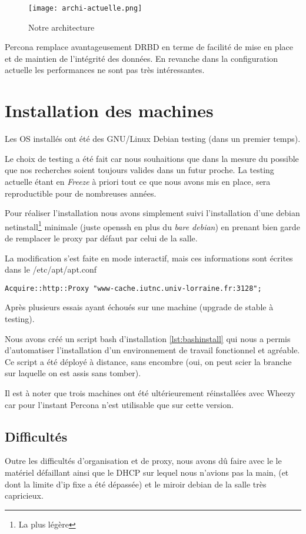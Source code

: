 \documentclass[a4paper,10pt,one side,titlepage]{report}
\begin{document}
\begin{figure}[H]
    \centering
    \texttt{[image: archi-actuelle.png]}
    \caption{Notre architecture}
    \label{fig:archiactuelle}
\end{figure}

Percona remplace avantageusement DRBD en terme de facilité de mise en place et de
maintien de l'intégrité des données. En revanche dans la configuration actuelle les
performances ne sont pas très intéressantes.



\section{Installation des machines}
Les OS installés ont été des GNU/Linux Debian testing (dans un premier temps).

Le choix de testing a été fait car nous souhaitions que dans la mesure du possible que
nos recherches soient toujours valides dans un futur proche. La testing actuelle 
étant en \textit{Freeze} à priori tout ce que nous avons mis en place, sera reproductible
pour de nombreuses années.

Pour réaliser l'installation nous avons simplement suivi l'installation d'une debian
netinstall\footnote{La plus légère} minimale (juste openssh en plus du \textit{bare debian}) 
en prenant bien garde de remplacer le proxy par défaut par celui de la salle.

La modification s'est faite en mode interactif, mais ces informations sont écrites
dans le /etc/apt/apt.conf

\begin{lstlisting}[style=code]
Acquire::http::Proxy "www-cache.iutnc.univ-lorraine.fr:3128";
\end{lstlisting}

Après plusieurs essais ayant échoués sur une machine (upgrade de stable à testing).

Nous avons créé un script bash d'installation \ref{lst:bashinstall} qui nous a permis 
d'automatiser l'installation d'un environnement de travail fonctionnel et agréable. 
Ce script a été déployé à distance, sans encombre (oui, on peut scier la branche 
sur laquelle on est assis sans tomber).

Il est à noter que trois machines ont été ultérieurement réinstallées avec Wheezy
car pour l'instant Percona n'est utilisable que sur cette version.

\subsection{Difficultés}
Outre les difficultés d'organisation et de proxy, nous avons dû faire avec le 
le matériel défaillant ainsi que le DHCP sur lequel nous n'avions pas la main, (et dont
la limite d'ip fixe a été dépassée) et le miroir debian de la salle très capricieux.
\end{document}
